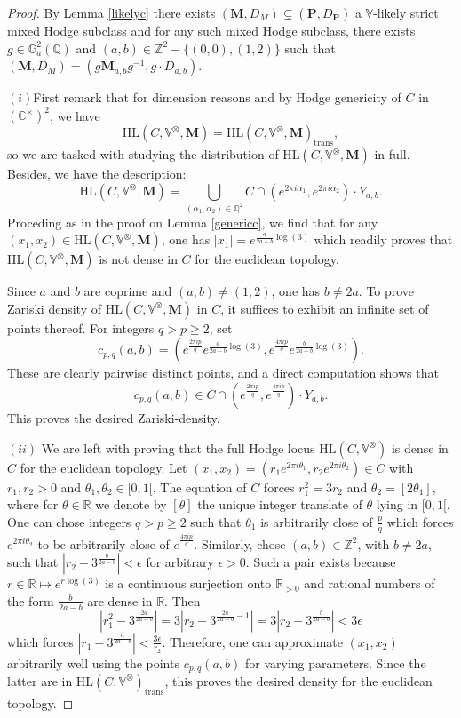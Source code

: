 \documentclass[10pt]{article}
\numberwithin{equation}{subsection}
\theoremstyle{plain}
\theoremstyle{definition}
\theoremstyle{remark}
\newcommand{\Z}{\mathbb Z}
\newcommand{\Q}{\mathbb Q}
\newcommand{\C}{\mathbb C}
\newcommand{\R}{\mathbb R}
\newcommand{\V}{\mathbb V}
\newcommand{\mult}{\mathbb G}
\newcommand{\pp}{\mathbf P}
\newcommand{\M}{\mathbf M}
\newcommand{\trans}{\mathrm{trans}}
\begin{document}
\begin{proof}
By Lemma \ref{likelyc} there exists $(\M,D_M) \subsetneq (\pp, D_\pp)$ a $\V$-likely strict mixed Hodge subclass and for any such mixed Hodge subclass, there exists $g \in \mult_a^2(\Q)$ and $(a,b) \in \Z^2-\{(0,0), (1,2)\}$ such that $(\M,D_M) = (g \M_{a,b} g^{-1}, g \cdot D_{a,b})$. 

$(i)$First remark that for dimension reasons and by Hodge genericity of $C$ in $(\C^\times)^2$, we have 
\[
\mathrm{HL}(C, \V^\otimes, \M) = \mathrm{HL}(C, \V^\otimes, \M)_\trans,
\]
so we are tasked with studying the distribution of $\mathrm{HL}(C, \V^\otimes, \M)$ in full. Besides, we have the description:
\[
\mathrm{HL}(C, \V^\otimes, \M) = \bigcup_{(\alpha_1, \alpha_2) \in \Q^2} C \cap (e^{2\pi i \alpha_1}, e^{2 \pi i \alpha_2}) \cdot Y_{a,b}.
\]
Proceding as in the proof on Lemma \ref{genericc}, we find that for any $(x_1,x_2) \in \mathrm{HL}(C, \V^\otimes, \M)$, one has $|x_1| = e^{\frac{a}{2a-b}\log(3)}$ which readily proves that $\mathrm{HL}(C, \V^\otimes, \M)$ is not dense in $C$ for the euclidean topology.

Since $a$ and $b$ are coprime and $(a,b) \neq (1,2)$, one has $b \neq 2a$. To prove Zariski density of $\mathrm{HL}(C, \V^\otimes, \M)$ in $C$, it suffices to exhibit an infinite set of points thereof. For integers $q > p \geqslant 2$, set
\[
c_{p,q}(a,b) = (e^{\frac{2 \pi i p}{q}} e^{\frac{a}{2a - b}\log(3)},e^{\frac{4 \pi ip}{q}} e^{\frac{b}{2a - b}\log(3)}).
\]
These are clearly pairwise distinct points, and a direct computation shows that
\[
c_{p,q}(a,b) \in C \cap (e^{\frac{2 \pi ip}{q}}, e^{\frac{4 \pi ip}{q}})\cdot Y_{a,b}.
\]
This proves the desired Zariski-density.

$(ii)$ We are left with proving that the full Hodge locus $\mathrm{HL}(C, \V^\otimes)$ is dense in $C$ for the euclidean topology. Let $(x_1,x_2) = (r_1e^{2\pi i \theta_1}, r_2 e^{2 \pi i \theta_2}) \in C$ with $r_1,r_2 > 0$ and $\theta_1, \theta_2 \in [0, 1[$. The equation of $C$ forces $r_1^2 = 3r_2$ and $\theta_2 = [2 \theta_1]$, where for $\theta \in \R$ we denote by $[\theta]$ the unique integer translate of $\theta$ lying in $[0,1[$. One can chose integers $q > p \geqslant 2$ such that $\theta_1$ is arbitrarily close of $\frac{p}{q}$ which forces $e^{2 \pi i \theta_2}$ to be arbitrarily close of $e^{\frac{4 \pi i p}{q}}$. Similarly, chose $(a,b) \in \Z^2$, with $b \neq 2a$, such that $|r_2 - 3^{\frac{b}{2a-b}}| < \epsilon$ for arbitrary $\epsilon > 0$. Such a pair exists because $r \in \R \mapsto e^{r\log(3)}$ is a continuous surjection onto $\R_{>0}$ and rational numbers of the form $\frac{b}{2a-b}$ are dense in $\R$. Then
\[
|r_1^2 - 3^{\frac{2a}{2a-b}}| = 3|r_2 - 3^{\frac{2a}{2a-b}-1}| = 3|r_2 - 3^{\frac{b}{2a-b}}| < 3 \epsilon
\]
which forces $|r_1 - 3^{\frac{a}{2a-b}}| < \frac{3 \epsilon}{r_2}$. Therefore, one can approximate $(x_1,x_2)$ arbitrarily well using the points $c_{p,q}(a,b)$ for varying parameters. Since the latter are in $\mathrm{HL}(C, \V^\otimes)_\trans$, this proves the desired density for the euclidean topology.
\end{proof}
\end{document}

